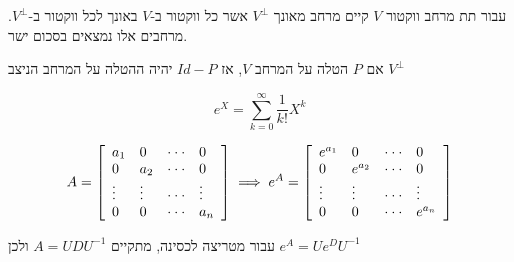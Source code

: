 \documentclass{tstextbook}
\begin{document}
\begin{definition}
עבור תת מרחב ווקטור \(V\) קיים מרחב מאונך \(V^\perp\) אשר כל ווקטור ב-\(V\) באונך לכל ווקטור ב-\(V^\perp\). מרחבים אלו נמצאים בסכום ישר.

\end{definition}
\begin{proposition}
אם \(P\) הטלה על המרחב \(V\), אז \(Id-P\) יהיה ההטלה על המרחב הניצב \(V^\perp\)

\end{proposition}
\begin{definition}
$$e^{X}=\sum_{k=0}^{\infty}{\frac{1}{k!}}X^{k}$$

\end{definition}
\begin{proposition}
$$A={\left[\begin{array}{l l l l}{a_{1}}&{0}&{\cdot\cdot\cdot}&{0}\\ {0}&{a_{2}}&{\cdot\cdot\cdot}&{0}\\ {\vdots}&{\vdots}&{\cdot\cdot\cdot}&{\vdots}\\ {0}&{0}&{\cdot\cdot\cdot}&{a_{n}}\end{array}\right]} \implies e^{A}={\left[\begin{array}{l l l l}{e^{a_{1}}}&{0}&{\cdot\cdot\cdot}&{0}\\ {0}&{e^{a_{2}}}&{\cdot\cdot\cdot}&{0}\\ {\vdots}&{\vdots}&{\cdot\cdot\cdot}&{\vdots}\\ {0}&{0}&{\cdot\cdot\cdot}&{e^{a_{n}}}\end{array}\right]}$$

\end{proposition}
\begin{corollary}
עבור מטריצה לכסינה, מתקיים \(A= UDU^{-1}\) ולכן \(e^A=Ue^DU^{-1}\)

\end{corollary}
\end{document}
